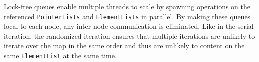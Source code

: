 \documentclass[letterpaper, 10 pt, conference]{ieeeconf}  %
\begin{document}
Lock-free queues enable multiple threads to scale by spawning operations on the referenced \texttt{PointerLists} and \texttt{ElementLists} in parallel. By making these queues local to each node, any inter-node communication is eliminated. Like in the serial iteration, the randomized iteration ensures that multiple iterations are unlikely to iterate over the map in the same order and thus are unlikely to content on the same \texttt{ElementList} at the same time.
\end{document}
